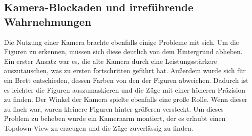 \subsection{Kamera-Blockaden und irreführende Wahrnehmungen}
Die Nutzung einer Kamera brachte ebenfalls einige Probleme mit sich. Um die Figuren zu erkennen, müssen sich diese deutlich von dem Hintergrund abheben.
Ein erster Ansatz war es, die alte Kamera durch eine Leistungsstärkere auszutauschen, was zu ersten fortschritten geführt hat. Außerdem wurde sich für 
ein Brett entschieden, dessen Farben von den der Figuren abweichen. Dadurch ist es leichter die Figuren auszumaskieren und die Züge mit einer höheren 
Präzision zu finden. Der Winkel der Kamera spielte ebenfalls eine große Rolle. Wenn dieser zu flach war, waren kleinere Figuren hinter größeren versteckt.
Um dieses Problem zu beheben wurde ein Kameraarm montiert, der es erlaubt einen Topdown-View zu erzeugen und die Züge zuverlässig zu finden.



